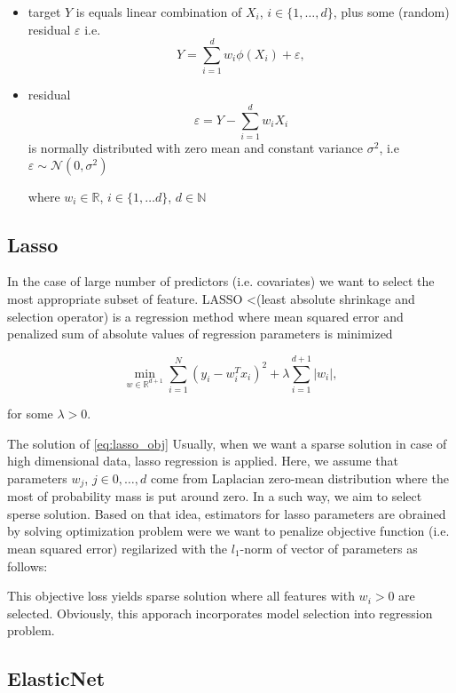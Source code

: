 \documentclass{article}
\begin{document}
\begin{itemize}
  \item target $Y$ is equals linear combination of $X_i$, $i\in\{1,\ldots, d\}$, plus some (random) residual $\varepsilon$ i.e.
  \begin{equation}
    Y = \sum_{i=1}^d w_i \phi(X_i) + \varepsilon,
  \end{equation}
  \item residual  
        $$\varepsilon = Y - \sum_{i=1}^d w_iX_i $$
        is normally distributed with zero mean and constant variance $\sigma^2$, i.e $\varepsilon\sim \mathcal{N}(0,\sigma^2)$
  
  
  where $w_i\in\mathbb{R}$, $i\in\{1,\ldots d\}$, $d\in \mathbb{N}$
\end{itemize}
\subsection{Lasso}
In the case of large number of predictors (i.e. covariates) we want to select the most appropriate subset of feature. LASSO \cite{tibshiraniRegressionShrinkageSelection1996} <(least absolute shrinkage and selection operator) is a regression method where mean squared error and penalized sum of absolute values of regression parameters is minimized

\begin{equation}\label{eq:lasso_obj}
  \min_{w\in \mathbb{R}^{d+1}} \sum_{i=1}^N(y_i-w_i^Tx_i)^2 + \lambda\sum_{i=1}^{d+1}|w_i|,
\end{equation}

for some $\lambda>0$.

The solution of \ref{eq:lasso_obj}
Usually, when we want a sparse solution in case of high dimensional data, lasso regression is applied. Here, we assume that parameters $w_j$, $j\in {0,\ldots, d}$ come from Laplacian zero-mean distribution where the most of probability mass is put around zero. In a such way, we aim to select sperse solution. Based on that idea, estimators for lasso parameters are obrained by solving optimization problem were we want to penalize objective function (i.e. mean squared error) regilarized with the $l_1$-norm of vector of parameters as follows:




This objective loss yields sparse solution where all features with $w_i>0$ are selected. Obviously, this apporach incorporates model selection into regression problem.

\subsection{ElasticNet}
\end{document}
